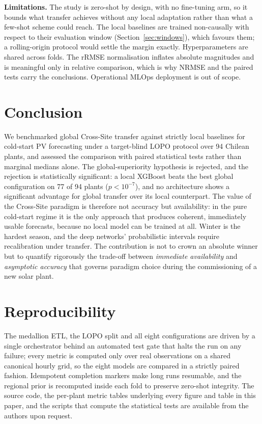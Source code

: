 \documentclass[conference]{IEEEtran}
\begin{document}
\textbf{Limitations.} The study is zero-shot by design, with no fine-tuning arm, so it bounds
what transfer achieves without any local adaptation rather than what a few-shot scheme could
reach. The local baselines are trained non-causally with respect to their evaluation window
(Section~\ref{sec:windows}), which favours them; a rolling-origin protocol would settle the
margin exactly. Hyperparameters are shared across folds. The rRMSE normalisation inflates
absolute magnitudes and is meaningful only in relative comparison, which is why NRMSE and the
paired tests carry the conclusions. Operational MLOps deployment is out of scope.

\section{Conclusion}
We benchmarked global Cross-Site transfer against strictly local baselines for cold-start PV
forecasting under a target-blind LOPO protocol over 94 Chilean plants, and assessed the
comparison with paired statistical tests rather than marginal medians alone. The
global-superiority hypothesis is rejected, and the rejection is statistically significant: a
local XGBoost beats the best global configuration on 77 of 94 plants ($p<10^{-7}$), and no
architecture shows a significant advantage for global transfer over its local counterpart.
The value of the Cross-Site paradigm is therefore not accuracy but availability: in the pure
cold-start regime it is the only approach that produces coherent, immediately usable
forecasts, because no local model can be trained at all. Winter is the hardest season, and
the deep networks' probabilistic intervals require recalibration under transfer. The
contribution is not to crown an absolute winner but to quantify rigorously the trade-off
between \emph{immediate availability} and \emph{asymptotic accuracy} that governs paradigm
choice during the commissioning of a new solar plant.

\section*{Reproducibility}
The medallion ETL, the LOPO split and all eight configurations are driven by a single
orchestrator behind an automated test gate that halts the run on any failure; every metric is
computed only over real observations on a shared canonical hourly grid, so the eight models
are compared in a strictly paired fashion. Idempotent completion markers make long runs
resumable, and the regional prior is recomputed inside each fold to preserve zero-shot
integrity. The source code, the per-plant metric tables underlying every figure and table in
this paper, and the scripts that compute the statistical tests are available from the authors
upon request.
\end{document}
